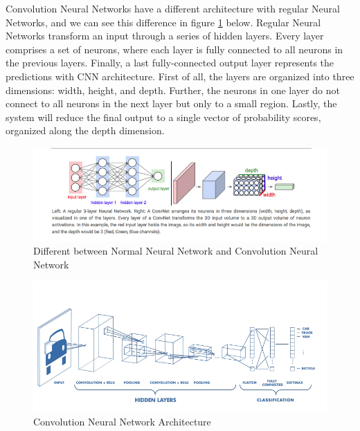 Convolution Neural Networks have a different architecture with regular Neural Networks, and we can see this difference in figure \ref{fig:Chap3-DiffArchCNN_NNN} below. Regular Neural Networks transform an input through a series of hidden layers. Every layer comprises a set of neurons, where each layer is fully connected to all neurons in the previous layers. Finally, a last fully-connected output layer represents the predictions with CNN architecture. First of all, the layers are organized into three dimensions: width, height, and depth. Further, the neurons in one layer do not connect to all neurons in the next layer but only to a small region. Lastly, the system will reduce the final output to a single vector of probability scores, organized along the depth dimension.

\begin{figure}[H]
	\centering
	\includegraphics[width=\textwidth]{img/Chap3/DiffArchCNN-ANN}
	\caption{Different between Normal Neural Network and Convolution Neural Network}
	\label{fig:Chap3-DiffArchCNN_NNN}
\end{figure}

\begin{figure}[H]
	\centering
	\includegraphics[width=\textwidth]{img/Chap3/CNN-Arch}
	\caption{Convolution Neural Network Architecture}
	\label{fig:Chap3-CNN_Arch}
\end{figure}

